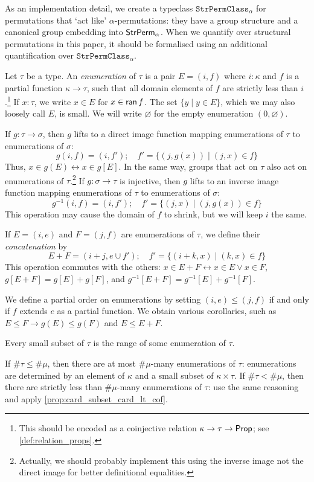 As an implementation detail, we create a typeclass \( \texttt{StrPermClass}_\alpha \) for permutations that `act like' \( \alpha \)-permutations: they have a group structure and a canonical group embedding into \( \mathsf{StrPerm}_\alpha \).
When we quantify over structural permutations in this paper, it should be formalised using an additional quantification over \( \texttt{StrPermClass}_\alpha \).
\begin{definition}[enumeration]
  \label{def:Enumeration}
  Let \( \tau \) be a type.
  An \emph{enumeration} of \( \tau \) is a pair \( E = (i, f) \) where \( i : \kappa \) and \( f \) is a partial function \( \kappa \to \tau \), such that all domain elements of \( f \) are strictly less than \( i \).\footnote{This should be encoded as a coinjective relation \( \kappa \to \tau \to \mathsf{Prop} \); see \cref{def:relation_props}.}
  If \( x : \tau \), we write \( x \in E \) for \( x \in \operatorname{\mathsf{ran}} f \).
  The set \( \{ y \mid y \in E \} \), which we may also loosely call \( E \), is small.
  We will write \( \varnothing \) for the empty enumeration \( (0, \varnothing) \).

  If \( g : \tau \to \sigma \), then \( g \) lifts to a direct image function mapping enumerations of \( \tau \) to enumerations of \( \sigma \):
  \[ g(i, f) = (i, f');\quad f' = \{ (j, g(x)) \mid (j, x) \in f \} \]
  Thus, \( x \in g(E) \leftrightarrow x \in g[E] \).
  In the same way, groups that act on \( \tau \) also act on enumerations of \( \tau \).\footnote{Actually, we should probably implement this using the inverse image not the direct image for better definitional equalities.}
  If \( g : \sigma \to \tau \) is injective, then \( g \) lifts to an inverse image function mapping enumerations of \( \tau \) to enumerations of \( \sigma \):
  \[ g^{-1}(i, f) = (i, f');\quad f' = \{ (j, x) \mid (j, g(x)) \in f \} \]
  This operation may cause the domain of \( f \) to shrink, but we will keep \( i \) the same.

  If \( E = (i, e) \) and \( F = (j, f) \) are enumerations of \( \tau \), we define their \emph{concatenation} by
  \[ E + F = (i + j, e \cup f');\quad f' = \{(i + k, x) \mid (k, x) \in f \} \]
  This operation commutes with the others: \( x \in E + F \leftrightarrow x \in E \vee x \in F \), \( g[E + F] = g[E] + g[F] \), and \( g^{-1}[E + F] = g^{-1}[E] + g^{-1}[F] \).

  We define a partial order on enumerations by setting \( (i, e) \leq (j, f) \) if and only if \( f \) extends \( e \) as a partial function.
  We obtain various corollaries, such as \( E \leq F \to g(E) \leq g(F) \) and \( E \leq E + F \).

  Every small subset of \( \tau \) is the range of some enumeration of \( \tau \).

  If \( \#\tau \leq \#\mu \), then there are at most \( \#\mu \)-many enumerations of \( \tau \): enumerations are determined by an element of \( \kappa \) and a small subset of \( \kappa \times \tau \).
  If \( \#\tau < \#\mu \), then there are strictly less than \( \#\mu \)-many enumerations of \( \tau \): use the same reasoning and apply \cref{prop:card_subset_card_lt_cof}.
\end{definition}
